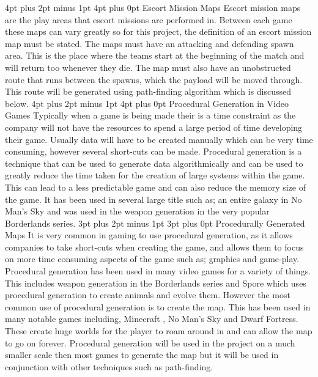 \documentclass[12pt,a4paper,oneside]{book}
\makeatletter
\renewcommand\subsection{\@startsection {subsection}{1}{2mm} %
                               {3pt plus 2pt minus 1pt} %
                               {3pt plus 0pt} %
                               {\normalfont\bfseries}}
\renewcommand\section{\@startsection {section}{1}{0mm} %
                               {4pt plus 2pt minus 1pt} %
                               {4pt plus 0pt} %
                               {\bfseries}}
\makeatother
\begin{document}
\section{Escort Mission Maps}
Escort mission maps are the play areas that escort missions are performed in. Between each game these maps can vary greatly so for this project, the definition of an escort mission map must be stated. The maps must have an attacking and defending spawn area. This is the place where the teams start at the beginning of the match and will return too whenever they die. The map must also have an unobstructed route that runs between the spawns, which the payload will be moved through. This route will be generated using path-finding algorithm which is discussed below.
\vspace{5mm} 
\newline 
\section{Procedural Generation in Video Games}
Typically when a game is being made their is a time constraint as the company will not have the resources to spend a large period of time developing their game. Usually data will have to be created manually which can be very time consuming, however several short-cuts can be made.
\vspace{5mm} 
\newline
Procedural generation is a technique that can be used  to generate data algorithmically and can be used to greatly reduce the time taken for the creation of large systems within the game. This can lead to a less predictable game and can also reduce the memory size of the game. It has been used in several large title such as; an entire galaxy in No Man's Sky and was used in the weapon generation in the very popular Borderlands series.  
\subsection{Procedurally Generated Maps}
It is very common in gaming to use procedural generation, as it allows companies to take short-cuts when creating the game, and allows them to focus on more time consuming aspects of the game such as; graphics and game-play. Procedural generation has been used in many video games for a variety of things. This includes weapon generation in the Borderlands series and Spore which uses procedural generation to create animals and evolve them. However the most common use of procedural generation is to create the map. This has been used in many notable games including, Minecraft , No Man’s Sky and Dwarf Fortress. These create huge worlds for the player to roam around in and can allow the map to go on forever. Procedural generation will be used in the project on a much smaller scale then most games to generate the map but it will be used in conjunction with other techniques such as path-finding.  
\vspace{5mm} 
\newline
\end{document}
